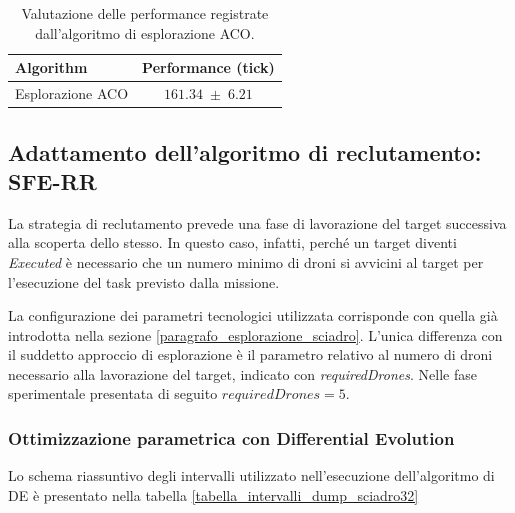 \begin{table}[H]
    \centering
    \captionsetup{justification=centering, margin=2cm, font=footnotesize}
    \begin{tabular}{|l|c|}
    \hline
    \textbf{Algorithm}              & \textbf{Performance (tick)}              \\ \hline
    Esplorazione ACO                & $161.34 \; \pm \; 6.21$           \\ \hline
    \end{tabular}%
    
    \caption{Valutazione delle performance registrate dall'algoritmo di esplorazione ACO.}
    \label{tabella_performance_dump_ACO}
\end{table}


\subsection{Adattamento dell'algoritmo di reclutamento: \\SFE-RR}

La strategia di reclutamento prevede una fase di lavorazione del target successiva alla scoperta dello stesso.
In questo caso, infatti, perché un target diventi \textit{Executed} è necessario che un numero minimo di droni si avvicini al target per l'esecuzione del task previsto dalla missione.

La configurazione dei parametri tecnologici utilizzata corrisponde con quella già introdotta nella sezione \ref{paragrafo_esplorazione_sciadro}.
L'unica differenza con il suddetto approccio di esplorazione è il parametro relativo al numero di droni necessario alla lavorazione del target, indicato con \textit{requiredDrones}.
Nelle fase sperimentale presentata di seguito $requiredDrones = 5$.

\subsubsection{Ottimizzazione parametrica con Differential Evolution}

Lo schema riassuntivo degli intervalli utilizzato nell'esecuzione dell'algoritmo di DE è presentato nella tabella \ref{tabella_intervalli_dump_sciadro32}

